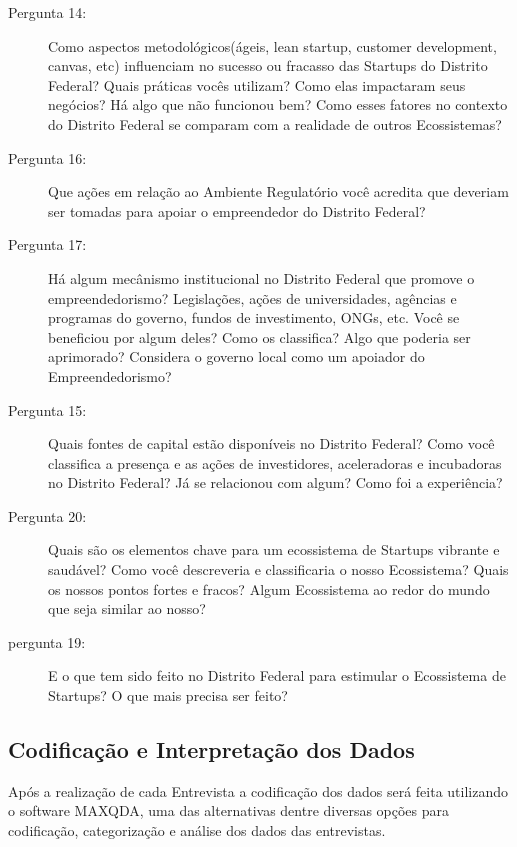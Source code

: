 \begin{description}
  \item [Pergunta 14:] Como aspectos metodológicos(ágeis, lean startup, customer development, canvas, etc) influenciam no sucesso ou fracasso das Startups do Distrito Federal? Quais práticas vocês utilizam? Como elas impactaram seus negócios? Há algo que não funcionou bem? Como esses fatores no contexto do Distrito Federal se comparam com a realidade de outros Ecossistemas?


  \item [Pergunta 16:] Que ações em relação ao Ambiente Regulatório você acredita que deveriam ser tomadas para apoiar o empreendedor do Distrito Federal?

  \item [Pergunta 17:] Há algum mecânismo institucional no Distrito Federal que promove o empreendedorismo? Legislações, ações de universidades, agências e programas do governo, fundos de investimento, ONGs, etc. Você se beneficiou por algum deles? Como os classifica? Algo que poderia ser aprimorado? Considera o governo local como um apoiador do Empreendedorismo?

  \item [Pergunta 15:] Quais fontes de capital estão disponíveis no Distrito Federal? Como você classifica a presença e as ações de investidores, aceleradoras e incubadoras no Distrito Federal? Já se relacionou com algum? Como foi a experiência?

  
  \item [Pergunta 20:] Quais são os elementos chave para um ecossistema de Startups vibrante e saudável? Como você descreveria e classificaria o nosso Ecossistema? Quais os nossos pontos fortes e fracos? Algum Ecossistema ao redor do mundo que seja similar ao nosso?

  \item [pergunta 19:] E o que tem sido feito no Distrito Federal para estimular o Ecossistema de Startups? O que mais precisa ser feito?
\end{description}

\subsection{Codificação e Interpretação dos Dados}
\label{subsection:codificacao_e_interpretacao_dos_dados}

Após a realização de cada Entrevista a codificação dos dados será feita utilizando o software MAXQDA, uma das alternativas dentre diversas opções para codificação, categorização e análise dos dados das entrevistas.